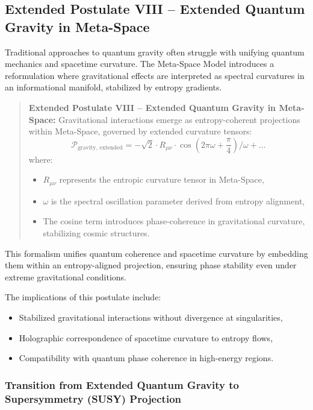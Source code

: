 \documentclass[10.5pt,a4paper]{article}
\begin{document}
\subsection{Extended Postulate VIII – Extended Quantum Gravity in Meta-Space}

Traditional approaches to quantum gravity often struggle with unifying quantum mechanics and spacetime curvature. 
The Meta-Space Model introduces a reformulation where gravitational effects are interpreted as spectral 
curvatures in an informational manifold, stabilized by entropy gradients.

\begin{quote}
\textbf{Extended Postulate VIII – Extended Quantum Gravity in Meta-Space:}  
Gravitational interactions emerge as entropy-coherent projections within Meta-Space, governed by 
extended curvature tensors:
\[
\mathcal{P}_{\text{gravity, extended}} = -\sqrt{2} \cdot R_{\mu\nu} \cdot \cos(2\pi \omega + \frac{\pi}{4}) / \omega + \ldots
\]
where:
\begin{itemize}
  \item \( R_{\mu\nu} \) represents the entropic curvature tensor in Meta-Space,
  \item \( \omega \) is the spectral oscillation parameter derived from entropy alignment,
  \item The cosine term introduces phase-coherence in gravitational curvature, stabilizing cosmic structures.
\end{itemize}

\end{quote}

This formalism unifies quantum coherence and spacetime curvature by embedding them within an entropy-aligned 
projection, ensuring phase stability even under extreme gravitational conditions.

The implications of this postulate include:
\begin{itemize}
  \item Stabilized gravitational interactions without divergence at singularities,
  \item Holographic correspondence of spacetime curvature to entropy flows,
  \item Compatibility with quantum phase coherence in high-energy regions.
\end{itemize}

\subsubsection*{Transition from Extended Quantum Gravity to Supersymmetry (SUSY) Projection}
\end{document}
